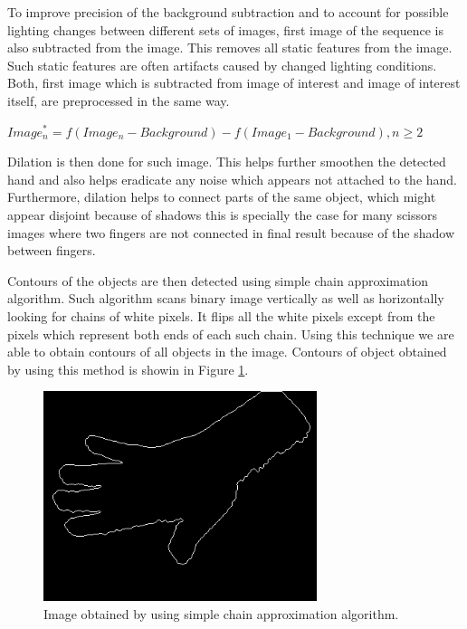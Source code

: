 To improve precision of the background subtraction and to account for possible lighting changes between different sets of images, first image of the sequence is also subtracted from the image. This removes all static features from the image. Such static features are often artifacts caused by changed lighting conditions. Both, first image which is subtracted from image of interest and image of interest itself, are preprocessed in the same way.

\begin{math}
Image^*_n = f(Image_n - Background) - f(Image_1 - Background), n \geq 2
\end{math}

Dilation is then done for such image. This helps further smoothen the detected hand and also helps eradicate any noise which appears not attached to the hand. Furthermore, dilation helps to connect parts of the same object, which might appear disjoint because of shadows this is specially the case for many scissors images where two fingers are not connected in final result because of the shadow between fingers.

Contours of the objects are then detected using simple chain approximation algorithm. Such algorithm scans binary image vertically as well as horizontally looking for chains of white pixels. It flips all the white pixels except from the pixels which represent both ends of each such chain. Using this technique we are able to obtain contours of all objects in the image. Contours of object obtained by using this method is showin in Figure \ref{fig:contours}.

\begin{figure}
\begin{center}
\includegraphics[width=80mm]{contours.png}
\caption{Image obtained by using simple chain approximation algorithm.}
\label{fig:contours}
\end{center}
\end{figure}

